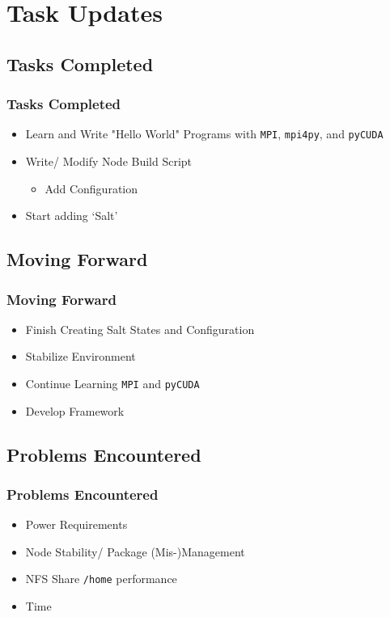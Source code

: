 \documentclass{beamer}
\begin{document}
\section{Task Updates}
\begin{frame}
\tableofcontents[currentsection]
\end{frame}
\subsection{Tasks Completed}
\begin{frame}
\frametitle{Tasks Completed}
\begin{itemize}
\item{Learn and Write "Hello World" Programs with \texttt{MPI},
\texttt{mpi4py}, and \texttt{pyCUDA}}
\item{Write/ Modify Node Build Script}
\begin{itemize}
\item{Add Configuration}
\end{itemize}
\item{Start adding `Salt'}
\end{itemize}
\end{frame}
\subsection{Moving Forward}
\begin{frame}
\frametitle{Moving Forward}
\begin{itemize}
\item{Finish Creating Salt States and Configuration}
\item{Stabilize Environment}
\item{Continue Learning \texttt{MPI} and \texttt{pyCUDA}}
\item{Develop Framework}
\end{itemize}
\end{frame}
\subsection{Problems Encountered}
\begin{frame}
\frametitle{Problems Encountered}
\begin{itemize}
\item{Power Requirements}
\item{Node Stability/ Package (Mis-)Management}
\item{NFS Share \texttt{/home} performance}
\item{Time}
\end{itemize}
\end{frame}
\end{document}
